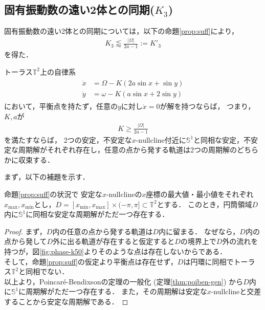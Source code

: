 \documentclass[../main]{subfiles}
\begin{document}
    \subsection{固有振動数の遠い2体との同期($K_3$)}
    \label{sec:3body-k3}
    固有振動数の遠い2体との同期については，以下の命題\ref{prop:suff}により，
    \begin{align*}
        K_3\lessapprox \frac{|\Omega|}{2a-1}:=K'_3
    \end{align*}
    を得た．
    \begin{proposition}
        \label{prop:suff}
        トーラス$\mathbb{T}^2$上の自律系
        \begin{align}
            \label{eq:prop-2phase}
            \begin{split}
                \dot{x}&=\Omega-K(2a\sin x+\sin y)\\
                \dot{y}&=\omega-K(a\sin x+2\sin y)
            \end{split}
        \end{align}
        において，平衡点を持たず，任意の$y$に対し$\dot{x}=0$が解を持つならば，
        つまり，$K,a$が
        \begin{align*}
            K\geq \frac{|\Omega|}{2a-1}
        \end{align*}
        を満たすならば，
        2つの安定，不安定な$x$-$\mathrm{nullcline}$付近に$\mathbb{S}^1$と同相な安定，不安定な周期解がそれぞれ存在し，任意の点から発する軌道は2つの周期解のどちらかに収束する．
    \end{proposition}
    まず，以下の補題を示す．
    \begin{lemma}
        \label{lemma:annulus}
        命題\ref{prop:suff}の状況で
        安定な$x$-nullclineの$x$座標の最大値・最小値をそれぞれ$x_{\max},x_{\min}$とし，$D=[x_{\min},x_{\max}]\times (-\pi,\pi ]\subset\mathbb{T}^2$とする．
        このとき，円筒領域$D$内に$\mathbb{S}^1$に同相な安定な周期解がただ一つ存在する．        
    \end{lemma}
    \begin{proof}
        まず，$D$内の任意の点から発する軌道は$D$内に留まる．
        なぜなら，$D$内の点から発して$D$外に出る軌道が存在すると仮定すると$D$の境界上で$D$外の流れを持つが，図\ref{fig:phase-k50}よりそのような点は存在しないからである．\\
        そして，命題\ref{prop:suff}の仮定より平衡点は存在せず，$D$は円環に同相でトーラス$\mathbb{T}^2$と同相でない．\\
        以上より，Poincaré-Bendixsonの定理の一般化 (定理\ref{thm:poiben-gen}) から$D$内に$\mathbb{S}^1$に周期解がただ一つ存在する．
        また，その周期解は安定な$x$-nullclineと交差することから安定な周期解である．        
    \end{proof}
\end{document}
